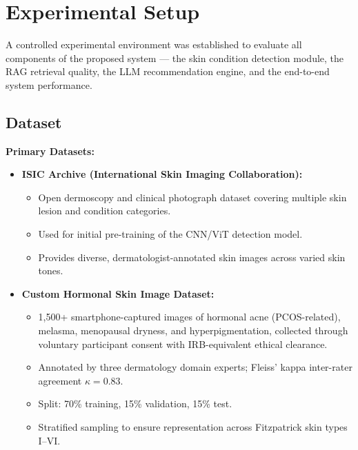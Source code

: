 \chapter{Experimental Setup}
\hspace*{0.5in}A controlled experimental environment was established to evaluate all components of the proposed system — the skin condition detection module, the RAG retrieval quality, the LLM recommendation engine, and the end-to-end system performance.\\

\section{Dataset}
\textbf{Primary Datasets:}
\begin{itemize}
    \item \textbf{ISIC Archive (International Skin Imaging Collaboration):}
    \begin{itemize}[label=$\diamond$]
        \item Open dermoscopy and clinical photograph dataset covering multiple skin lesion and condition categories.
        \item Used for initial pre-training of the CNN/ViT detection model.
        \item Provides diverse, dermatologist-annotated skin images across varied skin tones.
    \end{itemize}
    \vspace{0.3cm}

    \item \textbf{Custom Hormonal Skin Image Dataset:}
    \begin{itemize}[label=$\diamond$]
        \item 1,500+ smartphone-captured images of hormonal acne (PCOS-related), melasma, menopausal dryness, and hyperpigmentation, collected through voluntary participant consent with IRB-equivalent ethical clearance.
        \item Annotated by three dermatology domain experts; Fleiss' kappa inter-rater agreement $\kappa = 0.83$.
        \item Split: 70\% training, 15\% validation, 15\% test.
        \item Stratified sampling to ensure representation across Fitzpatrick skin types I--VI.
    \end{itemize}
    \vspace{0.3cm}


\end{itemize}
